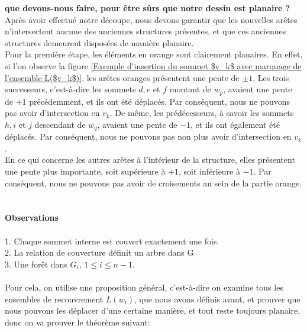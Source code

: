 \documentclass[hidelinks,letterpaper,12pt]{article}
\newtheorem{theorem}{Theorem}[section]
\newcounter{Exemple} %
\begin{document}
\textbf{que devons-nous faire, pour être sûrs que notre dessin est planaire ? }
\\
Après avoir effectué notre découpe, nous devons garantir que les nouvelles arêtes n'intersectent aucune des anciennes structures présentes, et que ces anciennes structures demeurent disposées de manière planaire.
\\
Pour la première étape, les éléments en orange sont clairement planaires. En effet, si l'on observe la figure \ref{Exemple d'insertion du sommet $v_k$ avec marquage de l'ensemble L($v_k$)}, les arêtes oranges présentent une pente de \( \pm 1 \). Les trois successeurs, c'est-à-dire les sommets \( d, e \) et $f$ montant de $w_p$, avaient une pente de $+1$ précédemment, et ils ont été déplacés. Par conséquent, nous ne pouvons pas avoir d'intersection en $v_k$. De même, les prédécesseurs, à savoir les sommets \( h, i\) et $j$ descendant de $w_q$, avaient une pente de $-1$, et ils ont également été déplacés. Par conséquent, nous ne pouvons pas non plus avoir d'intersection en $v_k$.
\\
En ce qui concerne les autres arêtes à l'intérieur de la structure, elles présentent une pente plus importante, soit supérieure à $+1$, soit inférieure à $-1$. Par conséquent, nous ne pouvons pas avoir de croisements au sein de la partie orange.
\\ \\ \\
\textbf{Observations}
\\
\\1. Chaque sommet interne est couvert exactement une fois.
\\2. La relation de couverture définit un arbre dans G
\\3. Une forêt dans $G_i$, $1 \leq i \leq n-1$.
\\ \\
Pour cela, on utilise une proposition général, c'est-à-dire on examine tous les ensembles de recouvrement \(L(w_i)\), que nous avons définis avant, et prouver que nous pouvons les déplacer d'une certaine manière, et tout reste toujours planaire, donc on va prouver le théorème suivant:
\\ \\
\noindent{}
\end{document}
